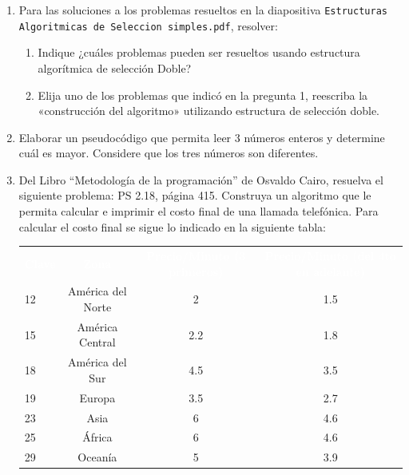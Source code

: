 \documentclass[spanish,11pt,twoside]{article}
\makeatletter
\DeclareRobustCommand\ttfamily
{\not@math@alphabet\ttfamily\mathtt
	\fontfamily\ttdefault\footnotesize\selectfont} %
\newcommand{\head}[1]{ %
	\textcolor{white}{\textbf{#1}}}
\renewcommand{\arraystretch}{1.5} %
\providecommand{\tightlist}{%
	\setlength{\itemsep}{3pt}\setlength{\parskip}{10pt}}
\makeatother
\begin{document}
\begin{enumerate}
	\tightlist %
	\item Para las soluciones a los problemas resueltos en la diapositiva \texttt{Estructuras Algoritmicas de Seleccion simples.pdf}, resolver:
	\begin{enumerate}
		\tightlist
		\item Indique ¿cuáles problemas pueden ser resueltos usando estructura algorítmica de selección Doble?
		\item Elija uno de los problemas que indicó en la pregunta 1, reescriba la «construcción del algoritmo» utilizando estructura de selección doble.
	\end{enumerate}
	

	\item Elaborar un pseudocódigo que permita leer 3 números enteros y determine cuál es mayor. Considere que los tres números son diferentes.	
	
	
	\item Del Libro ``Metodología de la programación'' de Osvaldo Cairo, resuelva el siguiente
	problema: \textsf{PS 2.18, página 415}. Construya un algoritmo que le permita calcular e imprimir el costo final de una llamada telefónica. Para calcular el costo final se sigue lo indicado en la siguiente tabla:
	
	\begin{table}[H]%
		\renewcommand{\arraystretch}{1.5} %
		\centering\footnotesize%
		\sffamily%
		
		\label{table:problemas:llamada}
		\begin{tabular}{lccc}
			\rowcolor{uasblue}%
			\head{Clave}& \head{Zona} 		& \head{Precio/Minuto (3 primeros)} & \head{Precio/Minuto (del 4to en adelante)}\\
			12 			& América del Norte	& 2									& 1.5 \\
			15			& América Central	& 2.2								& 1.8 \\
			18			& América del Sur	& 4.5								& 3.5 \\
			19			& Europa			& 3.5								& 2.7 \\
			23			& Asia				& 6									& 4.6 \\
			25			& África			& 6									& 4.6 \\
			29			& Oceanía			& 5									& 3.9 \\
		\end{tabular}
	\end{table}
	
\end{enumerate}
\end{document}
